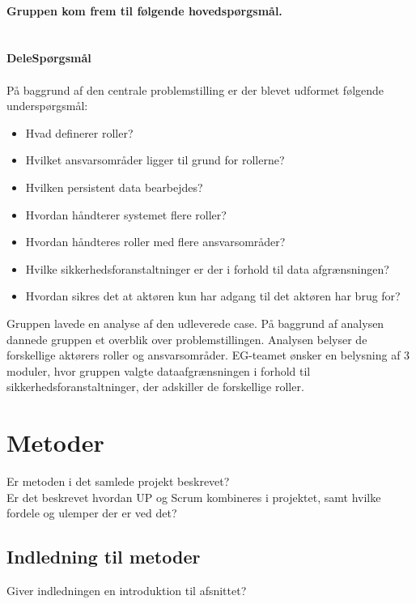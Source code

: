 \textbf{\\Gruppen kom frem til følgende hovedspørgsmål.}\\ \\
\noindent{}
 \textbf{\\DeleSpørgsmål\\}\\
På baggrund af den centrale problemstilling er der blevet udformet følgende underspørgsmål:\\ 
\begin{itemize}
\item Hvad definerer roller?
\item Hvilket ansvarsområder ligger til grund for rollerne?
\item Hvilken persistent data bearbejdes?
\item Hvordan håndterer systemet flere roller?
\item Hvordan håndteres roller med flere ansvarsområder?
\item Hvilke sikkerhedsforanstaltninger er der i forhold til data afgrænsningen?
\item Hvordan sikres det at aktøren kun har adgang til det aktøren har brug for? 
\end{itemize}
Gruppen lavede en analyse af den udleverede case. På baggrund af analysen dannede gruppen et overblik over problemstillingen. Analysen belyser de forskellige aktørers roller og ansvarsområder. EG-teamet ønsker en belysning af 3 moduler, hvor gruppen valgte dataafgrænsningen i forhold til sikkerhedsforanstaltninger, der adskiller de forskellige roller.




\section{Metoder}
Er metoden i det samlede projekt beskrevet?\\
Er det beskrevet hvordan UP og Scrum kombineres i projektet, samt hvilke fordele og ulemper der er ved det?\\

\subsection{Indledning til metoder}
Giver indledningen en introduktion til  afsnittet?\\
